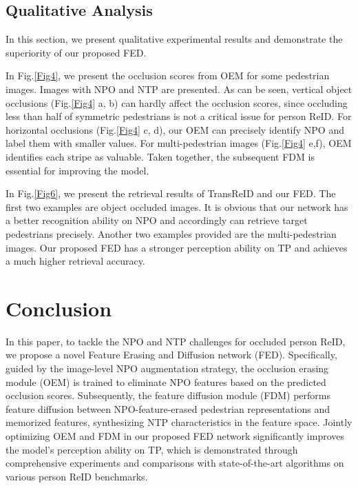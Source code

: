 \documentclass[10pt,twocolumn,letterpaper]{article}
\begin{document}
\subsection{Qualitative Analysis}
In this section, we present qualitative experimental results and demonstrate the superiority of our proposed FED. 


In Fig.\ref{Fig4}, we present the occlusion scores from OEM for some pedestrian images. Images with NPO and NTP are presented. As can be seen, vertical object occlusions (Fig.\ref{Fig4} a, b) can hardly affect the occlusion scores, since occluding less than half of symmetric pedestrians is not a critical issue for person ReID. For horizontal occlusions (Fig.\ref{Fig4} c, d), our OEM can precisely identify NPO and label them with smaller values. For multi-pedestrian images (Fig.\ref{Fig4} e,f), OEM identifies each stripe as valuable. Taken together, the subsequent FDM is essential for improving the model.


In Fig.\ref{Fig6}, we present the retrieval results of TransReID and our FED. The first two examples are object occluded images. It is obvious that our network has a better recognition ability on NPO and accordingly can retrieve target pedestrians precisely. Another two examples provided are the multi-pedestrian images. Our proposed FED has a stronger perception ability on TP and achieves a much higher retrieval accuracy.


\section{Conclusion}
In this paper, to tackle the NPO and NTP challenges for occluded person ReID, we propose a novel Feature Erasing and Diffusion network (FED). Specifically, guided by the image-level NPO augmentation strategy, the occlusion erasing module (OEM) is trained to eliminate NPO features based on the predicted occlusion scores. Subsequently, the feature diffusion module (FDM) performs feature diffusion between NPO-feature-erased pedestrian representations and memorized features, synthesizing NTP characteristics in the feature space. Jointly optimizing OEM and FDM in our proposed FED network significantly improves the model's perception ability on TP, which is demonstrated through comprehensive experiments and comparisons with state-of-the-art algorithms on various person ReID benchmarks.




\newpage
\end{document}
